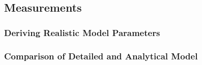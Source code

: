 \subsection{Measurements}\label{sec:cloud:crowdsourcing:measurements}
\subsubsection*{Deriving Realistic Model Parameters}
\subsubsection*{Comparison of Detailed and Analytical Model}
